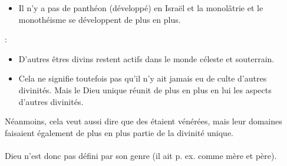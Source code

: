 \begin{itemize}
	\item Il n'y a pas de panthéon (développé) en Israël et la monolâtrie et le monothéisme se développent de plus en plus.
\end{itemize}
:
\begin{itemize}
	\item  D'autres êtres divins restent actifs dans le monde céleste et souterrain.
	\item  Cela ne signifie toutefois pas qu'il n'y ait jamais eu de culte d'autres divinités. Mais le Dieu unique réunit de plus en plus en lui les aspects d'autres divinités.
\end{itemize}

Néanmoins, cela veut aussi dire que des  étaient vénérées, mais leur domaines faisaient également de plus en plus partie de la divinité unique.\\
$ $\\
Dieu n'est donc pas défini par son genre (il ait p. ex. comme mère et père).



